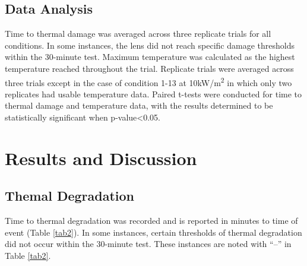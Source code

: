 \documentclass[sn-mathphys]{sn-jnl}%
\theoremstyle{thmstyleone}%
\theoremstyle{thmstyletwo}%
\theoremstyle{thmstylethree}%
\begin{document}
\subsection{Data Analysis}\label{subsec7}
Time to thermal damage was averaged across three replicate trials for all conditions. In some instances, the lens did not reach specific damage thresholds within the 30-minute test. Maximum temperature was calculated as the highest temperature reached throughout the trial. Replicate trials were averaged across three trials except in the case of condition 1-13 at 10kW/m\textsuperscript{2} in which only two replicates had usable temperature data. Paired t-tests were conducted for time to thermal damage and temperature data, with the results determined to be statistically significant when p-value\textless 0.05.{}

\section{Results and Discussion}\label{sec3}
\subsection{Themal Degradation}\label{subsec7}
Time to thermal degradation was recorded and is reported in minutes to time of event (Table \ref{tab2}). In some instances, certain thresholds of thermal degradation did not occur within the 30-minute test. These instances are noted with “--” in Table \ref{tab2}. 
\end{document}
